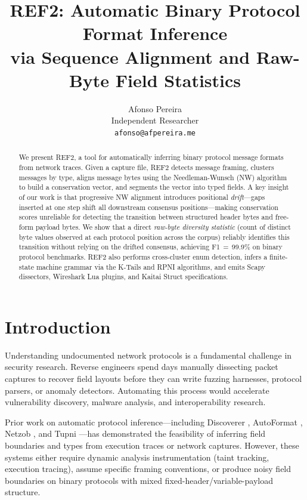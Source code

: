 \documentclass[letterpaper,twocolumn,10pt]{article}
\title{\textbf{REF2: Automatic Binary Protocol Format Inference\\
via Sequence Alignment and Raw-Byte Field Statistics}}
\author{
  Afonso Pereira\\
  \small Independent Researcher\\
  \small \texttt{afonso@afpereira.me}
}
\date{}
\begin{document}
\maketitle

\begin{abstract}
We present \textsc{REF2}, a tool for automatically inferring binary protocol
message formats from network traces.  Given a capture file, \textsc{REF2}
detects message framing, clusters messages by type, aligns message bytes using
the Needleman-Wunsch (NW) algorithm to build a conservation vector, and
segments the vector into typed fields.  A key insight of our work is that
progressive NW alignment introduces positional \emph{drift}---gaps inserted at
one step shift all downstream consensus positions---making conservation scores
unreliable for detecting the transition between structured header bytes and
free-form payload bytes.  We show that a direct \emph{raw-byte diversity
statistic} (count of distinct byte values observed at each protocol position
across the corpus) reliably identifies this transition without relying on the
drifted consensus, achieving F1\,$=\,$99.9\% on binary protocol benchmarks.
\textsc{REF2} also performs cross-cluster enum detection, infers a
finite-state machine grammar via the K-Tails and RPNI algorithms, and emits
Scapy dissectors, Wireshark Lua plugins, and Kaitai Struct specifications.
\end{abstract}

\section{Introduction}
\label{sec:intro}

Understanding undocumented network protocols is a fundamental challenge in
security research.  Reverse engineers spend days manually dissecting packet
captures to recover field layouts before they can write fuzzing harnesses,
protocol parsers, or anomaly detectors.  Automating this process would
accelerate vulnerability discovery, malware analysis, and interoperability
research.

Prior work on automatic protocol inference---including Discoverer
\cite{discoverer}, AutoFormat \cite{autoformat}, Netzob \cite{netzob}, and
Tupni \cite{tupni}---has demonstrated the feasibility of inferring field
boundaries and types from execution traces or network captures.  However, these
systems either require dynamic analysis instrumentation (taint tracking,
execution tracing), assume specific framing conventions, or produce noisy field
boundaries on binary protocols with mixed fixed-header/variable-payload
structure.
\end{document}
